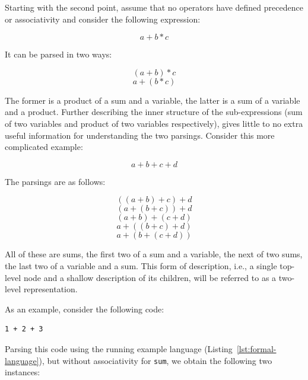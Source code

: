 \documentclass{kththesis}
\begin{document}
Starting with the second point, assume that no operators have defined precedence or associativity and consider the following expression:

$$ a + b * c $$

It can be parsed in two ways:

$$ (a + b) * c $$
$$ a + (b * c) $$

The former is a product of a sum and a variable, the latter is a sum of a variable and a product. Further describing the inner structure of the sub-expressions (sum of two variables and product of two variables respectively), gives little to no extra useful information for understanding the two parsings. Consider this more complicated example:

$$ a + b + c + d $$

The parsings are as follows:

$$ ((a + b) + c) + d $$
$$ (a + (b + c)) + d $$
$$ (a + b) + (c + d) $$
$$ a + ((b + c) + d) $$
$$ a + (b + (c + d)) $$

All of these are sums, the first two of a sum and a variable, the next of two sums, the last two of a variable and a sum. This form of description, i.e., a single top-level node and a shallow description of its children, will be referred to as a two-level representation.

As an example, consider the following code:

\begin{verbatim}
1 + 2 + 3
\end{verbatim}

Parsing this code using the running example language (Listing~\ref{lst:formal-language}), but without associativity for \texttt{sum}, we obtain the following two instances:
\end{document}
